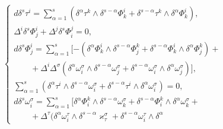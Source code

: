 \begin{equation}


\begin{cases}


d\delta^s\tau^i=\sum\limits_{\alpha=1}^{s}


(\delta^{\alpha}\tau^k\wedge


\delta^{s-\alpha}\Phi^i_k+


\delta^{s-\alpha}\tau^k\wedge


\delta^{\alpha}\Phi^i_k),\\


%


\Delta^i\delta^s\Phi^i_j+\Delta^j\delta^s\Phi^j_i=0,\\


%


d\delta^s\Phi^i_j=\sum\limits_{\alpha=1}^{s}[-(


\delta^{\alpha}\Phi^i_k\wedge\delta^{s-\alpha}\Phi^k_j


+\delta^{s-\alpha}\Phi^i_k\wedge\delta^{\alpha}\Phi^k_j)+\\


\qquad+\Delta^i\Delta^{\sigma}(


\delta^{\alpha}\omega^{\sigma}_i\wedge\delta^{s-\alpha}\omega^{\sigma}_j+


\delta^{s-\alpha}\omega^{\sigma}_i\wedge\delta^{\alpha}


\omega^{\sigma}_j)],\\


%


\sum\limits_{\alpha=1}^{s}(


\delta^{\alpha}\tau^i\wedge\delta^{s-\alpha}\omega^{\sigma}_i+


\delta^{s-\alpha}\tau^i\wedge\delta^{\alpha}\omega^{\sigma}_i)=0,\\


%


d\delta^s\omega^{\sigma}_i=\sum\limits_{\alpha=1}^{s}[


\delta^{\alpha}\Phi^k_i\wedge\delta^{s-\alpha}\omega^{\sigma}_k+


\delta^{s-\alpha}\Phi^k_i\wedge\delta^{\alpha}\omega^{\sigma}_k+\\


%


\qquad+\Delta^{\tau}(


\delta^{\alpha}\omega^{\tau}_i\wedge\delta^{s-\alpha}


\varkappa^{\sigma}_{\tau}+


\delta^{s-\alpha}\omega^{\tau}_i\wedge\delta^{\alpha}



\end{cases}
\end{equation}
